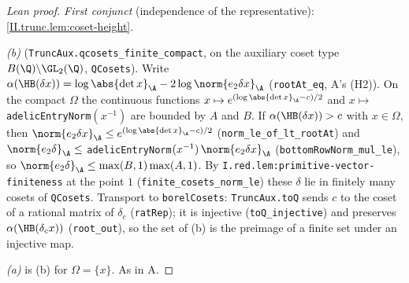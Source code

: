 \begin{proof}[Lean proof]
\emph{First conjunct} (independence of the representative): \cref{II.trunc.lem:coset-height}.

\emph{(b)} (\texttt{TruncAux.qcosets\_finite\_compact}, on the auxiliary coset type $B(\Q)\backslash\GL_2(\Q)$, \texttt{QCosets}). Write $\alpha(\HB(\delta x))=\log\abs{\det x}_\A-2\log\norm{e_2\delta x}_\A$ (\texttt{rootAt\_eq}, A's (H2)). On the compact $\Omega$ the continuous functions $x\mapsto e^{(\log\abs{\det x}_\A-c)/2}$ and $x\mapsto$ \texttt{adelicEntryNorm}$(x^{-1})$ are bounded by $A$ and $B$. If $\alpha(\HB(\delta x))>c$ with $x\in\Omega$, then $\norm{e_2\delta x}_\A\le e^{(\log\abs{\det x}_\A-c)/2}$ (\texttt{norm\_le\_of\_lt\_rootAt}) and $\norm{e_2\delta}_\A\le$ \texttt{adelicEntryNorm}$(x^{-1})\,\norm{e_2\delta x}_\A$ (\texttt{bottomRowNorm\_mul\_le}), so $\norm{e_2\delta}_\A\le\max(B,1)\max(A,1)$. By \texttt{I.red.lem:primitive-vector-finiteness} at the point $1$ (\texttt{finite\_cosets\_norm\_le}) these $\delta$ lie in finitely many cosets of \texttt{QCosets}. Transport to \texttt{borelCosets}: \texttt{TruncAux.toQ} sends $c$ to the coset of a rational matrix of $\delta_c$ (\texttt{ratRep}); it is injective (\texttt{toQ\_injective}) and preserves $\alpha(\HB(\delta_cx))$ (\texttt{root\_out}), so the set of (b) is the preimage of a finite set under an injective map.

\emph{(a)} is (b) for $\Omega=\{x\}$. As in A.
\end{proof}

